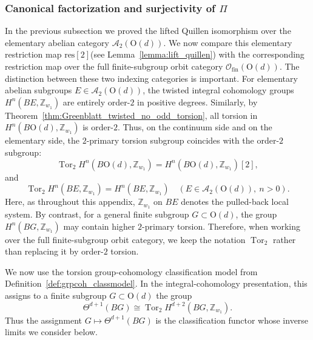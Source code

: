 \documentclass[aps,prx,reprint,superscriptaddress,twocolumn,amsmath,amssymb,amsfonts, nofootinbib]{revtex4-2}
\newcommand{\res}{\text{res}}
\newcommand{\Z}{\mathbb{Z}}
\theoremstyle{apsstyle}
\begin{document}
\subsubsection{Canonical factorization and surjectivity of $\Pi$}
\label{app:canon_factor}

In the previous subsection we proved the lifted Quillen isomorphism over the elementary abelian category $\mathcal A_2(\mathrm{O}(d))$. We now compare this elementary restriction map $\res[2]$(see Lemma~\ref{lemma:lift_quillen}) with the corresponding restriction map over the full finite-subgroup orbit category $\mathcal O_{\mathrm{fin}}(\mathrm{O}(d))$. The distinction between these two indexing categories is important. For elementary abelian subgroups $E\in\mathcal A_2(\mathrm{O}(d))$, the twisted integral cohomology groups $H^n(BE,\Z_{w_1})$ are entirely order-$2$ in positive degrees. Similarly, by Theorem~\ref{thm:Greenblatt_twisted_no_odd_torsion}, all torsion in $H^n(B\mathrm{O}(d),\Z_{w_1})$ is order-$2$. Thus, on the continuum side and on the elementary side, the $2$-primary torsion subgroup coincides with the order-$2$ subgroup:
\begin{equation}
\operatorname{Tor}_2 H^n(B\mathrm{O}(d),\Z_{w_1})
=
H^n(B\mathrm{O}(d),\Z_{w_1})[2],
\end{equation}
and
\begin{equation}
\operatorname{Tor}_2 H^n(BE,\Z_{w_1})
=
H^n(BE,\Z_{w_1})
\quad
(E\in\mathcal A_2(\mathrm{O}(d)),\ n>0).
\end{equation}
Here, as throughout this appendix, $\Z_{w_1}$ on $BE$ denotes the pulled-back local system. By contrast, for a general finite subgroup $G\subset \mathrm{O}(d)$, the group $H^n(BG,\Z_{w_1})$ may contain higher $2$-primary torsion. Therefore, when working over the full finite-subgroup orbit category, we keep the notation $\operatorname{Tor}_2$ rather than replacing it by order-$2$ torsion.

\bigskip 

We now use the torsion group-cohomology classification model from Definition~\ref{def:grpcoh_classmodel}. In the integral-cohomology presentation, this assigns to a finite subgroup $G\subset \mathrm{O}(d)$ the group
\begin{equation}
\Theta^{d+1}(BG)
\cong
\operatorname{Tor}_2 H^{d+2}(BG,\Z_{w_1}).
\end{equation}
Thus the assignment $G\mapsto \Theta^{d+1}(BG)$ is the classification functor whose inverse limits we consider below.

\bigskip 
\end{document}
